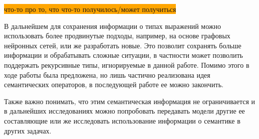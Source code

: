 \documentclass[times,specification,annotation]{itmo-student-thesis}
\begin{document}
\colorbox{orange}{что-то про то, что что-то получилось/может получиться}

В дальнейшем для сохранения информации о типах выражений можно использовать более продвинутые подходы, например, на основе графовых нейронных сетей, или же разработать новые. Это позволит сохранять больше информации и обрабатывать сложные ситуации, в частности может позволить поддержать рекурсивные типы, игнорируемые в данной работе. Помимо этого в ходе работы была предложена, но лишь частично реализована идея семантических операторов, в последующей работе ее можно закончить. 

Также важно понимать, что этим семантическая информация не ограничивается и в дальнейших исследованиях можно попробовать передавать модели другие ее составляющие или же исследовать использование информации о семантике в других задачах.

\printmainbibliography
\end{document}
